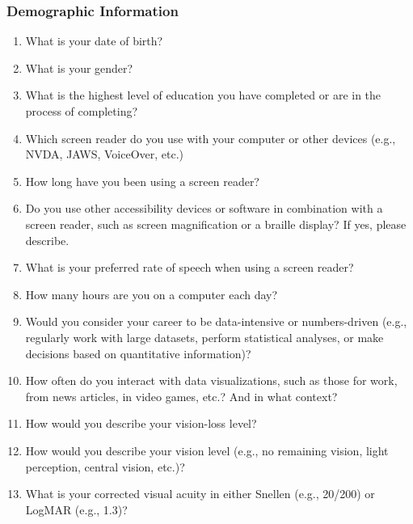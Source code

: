 \documentclass{egpubl}
\begin{document}
\subsubsection{Demographic Information}
\begin{enumerate}
    \item What is your date of birth?
    \item What is your gender?
    \item What is the highest level of education you have completed or are in the process of completing?
    \item Which screen reader do you use with your computer or other devices (e.g., NVDA, JAWS, VoiceOver, etc.)
    \item How long have you been using a screen reader?
    \item Do you use other accessibility devices or software in combination with a screen reader, such as screen magnification or a braille display? If yes, please describe.
    \item What is your preferred rate of speech when using a screen reader?
    \item How many hours are you on a computer each day?
    \item Would you consider your career to be data-intensive or numbers-driven (e.g., regularly work with large datasets, perform statistical analyses, or make decisions based on quantitative information)?
    \item How often do you interact with data visualizations, such as those for work, from news articles, in video games, etc.? And in what context?
    \item How would you describe your vision-loss level?
    \item How would you describe your vision level (e.g., no remaining vision, light perception, central vision, etc.)?
    \item What is your corrected visual acuity in either Snellen (e.g., 20/200) or LogMAR (e.g., 1.3)?
\end{enumerate}
\end{document}
